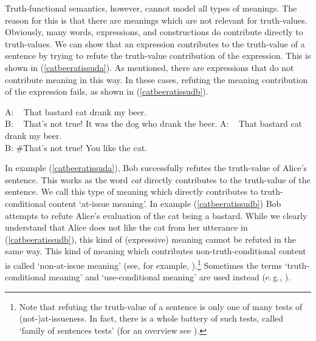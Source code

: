 Truth-functional semantics, however, cannot model all types of meanings. The reason for this is that there are meanings which are not relevant for truth-values. Obviously, many words, expressions, and constructions do contribute directly to truth-values. We can show that an expression contributes to the truth-value of a sentence by trying to refute the truth-value contribution of the expression. This is shown in (\ref{catbeeratissuda}). As mentioned, there are expressions that do not contribute meaning in this way. In these cases, refuting the meaning contribution of the expression fails, as shown in (\ref{catbeeratissudb}). 

\begin{exe}
\ex\label{catbeeratissud}\begin{xlist}
\ex A: \textcolor{white}{\#}That bastard cat drank my beer.  \\
B: \textcolor{white}{\#}That's not true! It was the dog who drank the beer.\label{catbeeratissuda}
\ex A: \textcolor{white}{\#}That bastard cat drank my beer.  \\
B: {\#}That's not true! You like the cat.\label{catbeeratissudb}
\end{xlist}
\end{exe}

\noindent In example (\ref{catbeeratissuda}), Bob successfully refutes the truth-value of Alice's sentence. This works as the word \textit{cat} directly contributes to the truth-value of the sentence. We call this type of meaning which directly contributes to truth-conditional content `at-issue meaning'. In example (\ref{catbeeratissudb}) Bob attempts to refute Alice's evaluation of the cat being a bastard. While we clearly understand that Alice does not like the cat from her utterance in (\ref{catbeeratissudb}), this kind of (expressive) meaning cannot be refuted in the same way. This kind of meaning which contributes non-truth-conditional content is called `non-at-issue meaning' (see, for example, \citealt{karttunen1973presuppositions, simons2010projects, tonhauser2013toward, gutzmann2015use, potts2005logic}).\footnote{ Note that refuting the truth-value of a sentence is only one of many tests of (not-)at-issueness. In fact, there is a whole battery of such tests, called `family of sentences tests' (for an overview see \citealt{potts2005logic}).} Sometimes the terms `truth-conditional meaning' and `use-conditional meaning' are used instead (e.\,g., \citealt{gutzmann2015use}).

